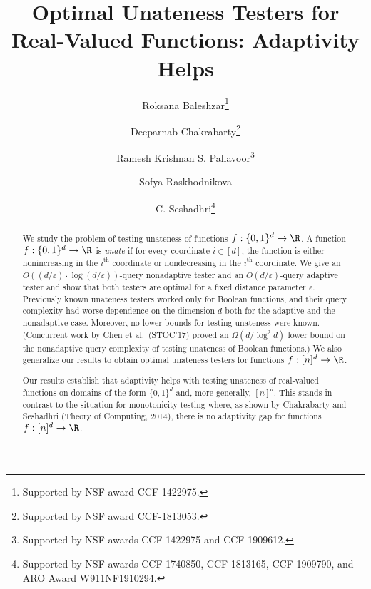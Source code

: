 \documentclass{toc}
\newcommand{\eps}{\varepsilon}
\newcommand{\ord}[2][th]{\ensuremath{{#2}^{\mathrm{#1}}}}
\begin{document}
\begin{frontmatter} %
  
%
%

%
%

\title{Optimal Unateness Testers for Real-Valued Functions: Adaptivity Helps}

%
%
%
%
%
%
%
%
%
%
%
%


%
%
%
%

%

\author[baleshzar]{Roksana Baleshzar\thanks{Supported by NSF award CCF-1422975.}}
\author[chakrabarty]{Deeparnab Chakrabarty\thanks{Supported by NSF award CCF-1813053.}}
\author[pallavoor]{Ramesh Krishnan S. Pallavoor\thanks{Supported by NSF awards CCF-1422975 and CCF-1909612.}}
\author[raskhodnikova]{Sofya Raskhodnikova\footnotemark[3]}
%
\author[seshadhri]{C. Seshadhri\thanks{Supported by NSF awards CCF-1740850, CCF-1813165, CCF-1909790, and ARO Award W911NF1910294.}}

%
%
%
%

%
%
%
%
%
%
\begin{abstract}
We study the problem of testing unateness of functions $f:\{0,1\}^d \to \R$.
A function $f:\{0,1\}^d \to \R$ is \emph{unate} if for every coordinate $i\in [d]$, the function is either nonincreasing in the $\ord{i}$ coordinate or nondecreasing in the $\ord{i}$ coordinate.
We give an $O((d/\eps) \cdot \log(d/\eps))$-query nonadaptive tester and an
$O(d/\eps)$-query adaptive tester and show that both testers are optimal for a fixed distance parameter $\eps$. Previously known unateness testers worked only for Boolean functions, and their query complexity had worse dependence on the dimension $d$ both for the adaptive and the nonadaptive case. Moreover, no lower bounds for testing unateness were known. (Concurrent work by Chen et al.~(STOC'17) proved an $\Omega(d/\log^2 d)$ lower bound on the nonadaptive query complexity of testing unateness of Boolean functions.)
We also generalize our results to obtain optimal unateness testers for functions $f:[n]^d\to\R$.

Our results establish that adaptivity helps with testing unateness of real-valued functions on domains of the form $\{0,1\}^d$ and, more generally, $[n]^d$.
This  stands in contrast to the situation for monotonicity testing where, as shown by Chakrabarty and Seshadhri (Theory of Computing, 2014), there is no adaptivity gap for functions $f:[n]^d\to\R$.
\end{abstract}

%

\end{frontmatter}
\end{document}
